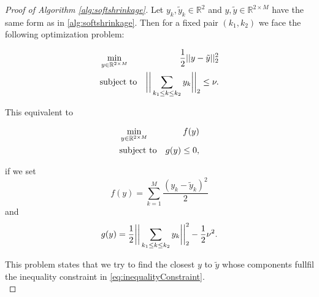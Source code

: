             \begin{proof}[Proof of Algorithm \ref{alg:softshrinkage}]
                Let $y_{k}, \tilde{y}_{k} \in \mathbb{R}^{2}$ and $y, \tilde{y} \in \mathbb{R}^{2 \times M}$ have the same form as in \ref{alg:softshrinkage}. Then for a fixed pair $(k_{1}, k_{2})$ we face the following optimization problem: %

                \begin{eqnarray}
                    &\min\limits_{y \in \mathbb{R}^{2 \times M}}& \frac{1}{2} ||y - \tilde{y}||^{2}_{2} \notag \\
                    &\textnormal{subject to}& \bigg{|} \bigg{|} \sum_{k_{1} \le k \le k_{2}} y_{k} \bigg{|} \bigg{|}_{2} \le \nu. \notag
                \end{eqnarray}

                This equivalent to

                \begin{eqnarray}
                    &\min\limits_{y \in \mathbb{R}^{2 \times M}}& f(y) \notag \\
                    &\textnormal{subject to}& g(y) \le 0, \label{eq:inequalityConstraint}
                \end{eqnarray}

                if we set
                    $$f(y) = \sum_{k = 1}^{M} \frac{(y_{k} - \tilde{y}_{k})^{2}}{2}$$
                and
                    $$g(y) = \frac{1}{2} \bigg{|} \bigg{|} \sum_{k_{1} \le k \le k_{2}} y_{k} \bigg{|} \bigg{|}_{2}^{2} - \frac{1}{2} \nu^{2}.$$

                This problem states that we try to find the closest $y$ to $\tilde{y}$ whose components fullfil the inequality constraint in \ref{eq:inequalityConstraint}.\\



\end{proof}
